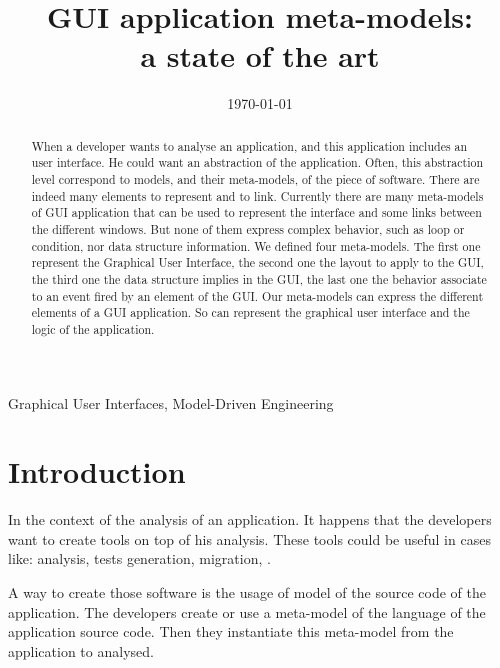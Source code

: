 \documentclass[conference]{IEEEtran}
\author{
    \IEEEauthorblockN{Beno\^{i}t Verhaeghe$^{1,2}$, Anne Etien$^1$,\\ Nicolas Anquetil$^1$, St\'{e}phane Ducasse$^1$}\IEEEauthorblockA{$^1$Universit\'{e} de Lille, CNRS, Inria, \\ Centrale Lille, UMR 9189 -- CRIStAL, France\\}
    \and
    \IEEEauthorblockN{Abderrahmane Seriai$^2$, Laurent Deruelle$^2$,\\ Mustapha Derras$^2$}\IEEEauthorblockA{$^2$Berger-Levrault, France}     
}
\begin{document}
\title{GUI application meta-models:\\ a state of the art}


\date{\today}
\maketitle

\begin{abstract}

When a developer wants to analyse an application,
    and this application includes an user interface.
He could want an abstraction of the application.
Often, this abstraction level correspond to models, and their meta-models, of
    the piece of software.
There are indeed many elements to represent and to link.
Currently there are many meta-models of GUI application
    that can be used to represent the interface
    and some links between the different windows.
But none of them express complex behavior, such as loop or condition,
    nor data structure information.
We defined four meta-models.
The first one represent the Graphical User Interface,
    the second one the layout to apply to the GUI, 
    the third one the data structure implies in the GUI, 
    the last one the behavior associate to an event fired by an element of the GUI. 
Our meta-models can express the different elements of a GUI application.
So can represent the graphical user interface
    and the logic of the application.

   
\end{abstract}

\begin{IEEEkeywords}
    Graphical User Interfaces, Model-Driven Engineering
\end{IEEEkeywords}

\section{Introduction}
\label{sec:intro}

 
In the context of the analysis of an application.
It happens that the developers want to create tools on top of his analysis.
These tools could be useful in cases like:
    analysis, tests generation, migration, \etc.

A way to create those software is the usage of model of the source code of the application.
The developers create or use a meta-model of the language of the application source code.
Then they instantiate this meta-model from the application to analysed.
\end{document}
